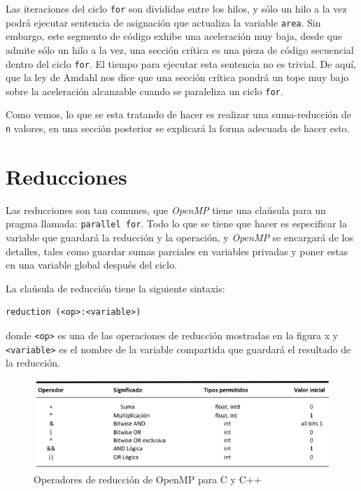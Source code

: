 \documentclass[12pt,letterpaper]{book}
\begin{document}
Las iteraciones del ciclo \texttt{for} son divididas entre los hilos, y sólo un hilo a la vez podrá ejecutar sentencia de asignación que actualiza la variable \texttt{area}. Sin embargo, este segmento de código exhibe una aceleración muy baja, desde que admite sólo un hilo a la vez, una sección crítica es una pieza de código secuencial dentro del ciclo \texttt{for}. El tiempo para ejecutar esta sentencia no es trivial. De aquí, que la ley de Amdahl nos dice que una sección crítica pondrá un tope muy bajo sobre la aceleración alcanzable cuando se paraleliza un ciclo \texttt{for}.

Como vemos, lo que se esta tratando de hacer es realizar una suma-reducción de \texttt{n} valores, en una sección posterior se explicará la forma adecuada de hacer esto.


\section{Reducciones}
Las reducciones son tan comunes, que \textit{OpenMP} tiene una claúsula para un pragma llamada: \texttt{parallel for}. Todo lo que se tiene que hacer es especificar la variable que guardará la reducción y la operación, y \textit{OpenMP} se encargará de los detalles, tales como guardar sumas parciales en variables privadas y poner estas en una variable global después del ciclo.

La claúsula de reducción tiene la siguiente sintaxis:

\begin{lstlisting}[style=C]
reduction (<op>:<variable>)
\end{lstlisting}

donde \texttt{<op>} es una de las operaciones de reducción mostradas en la figura x y \texttt{<variable>} es el nombre de la variable compartida que guardará el resultado de la reducción.

\begin{figure}
\begin{center}
\includegraphics[width=12cm]{../imagenes/op_reduc.png} 
\end{center}
\caption{Operadores de reducción de OpenMP para C y C++}
\label{fig:op_reduc}
\end{figure}
\end{document}
